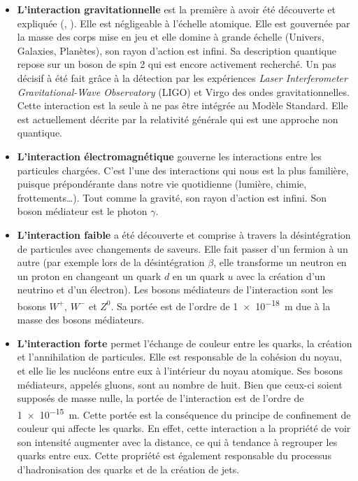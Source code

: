\begin{itemize}[label=$\bullet$]
\item \textbf{L'interaction gravitationnelle} est la première à avoir été découverte et expliquée (, ). Elle est négligeable à l'échelle atomique. Elle est gouvernée par la masse des corps mise en jeu et elle domine à grande échelle (Univers, Galaxies, Planètes), son rayon d'action est infini. Sa description quantique repose sur un boson de spin \num{2} qui est encore activement recherché. Un pas décisif à été fait grâce à la détection par les expériences \textit{Laser Interferometer Gravitational-Wave Observatory} (LIGO) et Virgo des ondes gravitationnelles. Cette interaction est la seule à ne pas être intégrée au Modèle Standard. Elle est actuellement décrite par la relativité générale qui est une approche non quantique.

\item \textbf{L'interaction électromagnétique} gouverne les interactions entre les particules chargées. C'est l'une des interactions qui nous est la plus familière, puisque prépondérante dans notre vie quotidienne (lumière, chimie, frottements\ldots). Tout comme la gravité, son rayon d'action est infini. Son boson médiateur est le photon $\gamma$.

\item \textbf{L'interaction faible} a été découverte et comprise à travers la désintégration de particules avec changements de saveurs. Elle fait passer d'un fermion à un autre (par exemple lors de la désintégration $\beta$, elle transforme un neutron en un proton en changeant un quark $d$ en un quark $u$ avec la création d'un neutrino et d'un électron). Les bosons médiateurs de l'interaction sont les bosons $W^{+}$, $W^{-}$ et $Z^{0}$. Sa portée est de l'ordre de \SI{1e-18}{\meter} due à la masse des bosons médiateurs.

\item \textbf{L'interaction forte} permet l'échange de couleur entre les quarks, la création et l'annihilation de particules. Elle est responsable de la cohésion du noyau, et elle lie les nucléons entre eux à l'intérieur du noyau atomique. Ses bosons médiateurs, appelés gluons, sont au nombre de huit. Bien que ceux-ci soient supposés de masse nulle, la portée de l'interaction est de l'ordre de \SI{1e-15}{\meter}. Cette portée est la conséquence du principe de confinement de couleur qui affecte les quarks. En effet, cette interaction a la propriété de voir son intensité augmenter avec la distance, ce qui à tendance à regrouper les quarks entre eux. Cette propriété est également responsable du processus d'hadronisation des quarks et de la création de jets.
\end{itemize}

